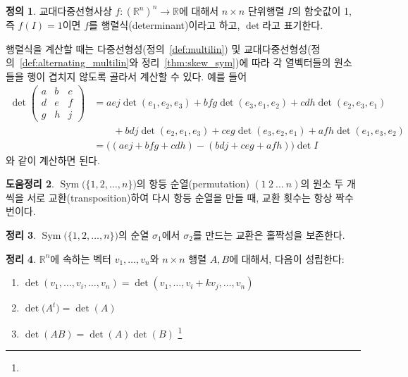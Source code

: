 \documentclass[unfonts,oneside,a4paper]{oblivoir}
\theoremstyle{definition}
\newtheorem{definition}{정의}[section]
\theoremstyle{theorem}
\newtheorem{theorem}[definition]{정리}
\theoremstyle{theorem}
\newtheorem{lemma}[definition]{도움정리}
\theoremstyle{remark}
\theoremstyle{remark}
\theoremstyle{remark}
\theoremstyle{remark}
\renewcommand{\vec}[1]{\bm{\mathit{#1}}}
\DeclareMathOperator{\Sym}{Sym}
\begin{document}
\begin{definition}
    교대다중선형사상 $f: (\mathbb R^n)^n \rightarrow \mathbb R$에 대해서 $n \times n$ 단위행렬 $I$의 함숫값이 1, 즉 $f(I) = 1$이면 $f$를 행렬식(determinant)이라고 하고, $\det$라고 표기한다.
\end{definition}

행렬식을 계산할 때는 다중선형성(정의~\ref{def:multilin}) 및 교대다중선형성(정의~\ref{def:alternating_multilin}와 정리~\ref{thm:skew_sym})에 따라 각 열벡터들의 원소들을 행이 겹치지 않도록 골라서 계산할 수 있다.
예를 들어
\begin{align*}
    \det
    \begin{pmatrix}
        a & b & c\\
        d & e & f\\
        g & h & j
    \end{pmatrix}
    &= aej \det (\vec e_1, \vec e_2, \vec e_3) + bfg \det (\vec e_3, \vec e_1, \vec e_2) + cdh \det (\vec e_2, \vec e_3, \vec e_1)\\
    &\qquad+ bdj \det (\vec e_2, \vec e_1, \vec e_3) + ceg \det (\vec e_3, \vec e_2, \vec e_1) + afh \det (\vec e_1, \vec e_3, \vec e_2)\\
    &= \bigl((aej + bfg + cdh) - (bdj + ceg + afh)\bigr) \det I
\end{align*}
와 같이 계산하면 된다.

\begin{lemma}
    $\Sym\bigl(\{1, 2, \dots, n\}\bigr)$의 항등 순열(permutation) $(1\ 2\ \dots\ n)$의 원소 두 개씩을 서로 교환(transposition)하여 다시 항등 순열을 만들 때, 교환 횟수는 항상 짝수번이다.
\end{lemma}

\begin{theorem}
    $\Sym\bigl(\{1, 2, \dots, n\}\bigr)$의 순열 $\sigma_1$에서 $\sigma_2$를 만드는 교환은 홀짝성을 보존한다.
\end{theorem}

\begin{theorem} \label{thm:det_props}
    $\mathbb R^n$에 속하는 벡터 $\vec v_1, \dots, \vec v_n$와 $n \times n$ 행렬 $A, B$에 대해서, 다음이 성립한다:
    \begin{enumerate}
        \item $\det(\vec v_1, \dots, \vec v_i, \dots, \vec v_n) = \det(\vec v_1, \dots, \vec v_i + k \vec v_j, \dots, \vec v_n)$
        \item $\det\bigl(A^t\bigr) = \det(A)$
        \item $\det(AB) = \det(A) \det(B)$ \footnote{}
    \end{enumerate}
\end{theorem}
\end{document}
